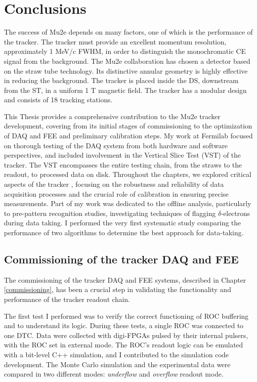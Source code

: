 \chapter{Conclusions}\label{conclusions}
The success of Mu2e depends on many factors, 
one of which is the performance of the tracker. 
The tracker must provide an excellent momentum 
resolution, approximately 1 MeV/c FWHM, 
in order to distinguish the monochromatic CE 
signal from the background. 
The Mu2e collaboration has chosen a detector 
based on the straw tube technology.  
Its distinctive annular geometry is highly 
effective in reducing the background. 
The tracker is placed inside the 
DS, downstream from the ST, 
in a uniform 1 T magnetic field. The tracker  
has a modular design and consists of 18 tracking stations.

This Thesis provides a comprehensive 
contribution to the Mu2e tracker 
development, covering from its initial stages of 
commissioning to the optimization 
of DAQ and FEE and preliminary calibration 
steps. My work at Fermilab 
focused on thorough testing of the DAQ system 
from both hardware and 
software perspectives, and included 
involvement in the Vertical Slice Test 
(VST) of the tracker. 
The VST encompasses the entire testing 
chain, from the straws to the readout, 
to processed data on disk.
Throughout the chapters, we explored 
critical aspects of the tracker ,
focusing on the robustness and 
reliability of data acquisition 
processes and the crucial role of 
calibration in ensuring precise measurements. 
Part of my work was dedicated to the offline 
analysis, particularly to pre-pattern recognition 
studies, investigating techniques of   
flagging $\delta$-electrons during data taking. 
I performed the very first systematic study 
comparing the performance of two algorithms 
to determine the best approach for data-taking. 
\section{Commissioning of the tracker DAQ and FEE}
The commissioning of the tracker DAQ and FEE 
systems, described in Chapter 
\ref{commissioning}, has been a crucial step 
in validating the functionality 
and performance of the tracker readout chain.

The first test I performed was to verify the 
correct functioning of 
 ROC buffering and to understand its logic. 
During these tests, a single 
ROC was connected to one DTC. Data were 
collected with digi-FPGAs pulsed 
by their internal pulsers, with the ROC set 
in external mode. The ROC's  
readout logic can be emulated with a bit-level 
C++ simulation, and I contributed to the simulation code development. 
The Monte Carlo simulation 
and the experimental data were compared in two different modes: 
\textit{underflow} and \textit{overflow} readout mode.

